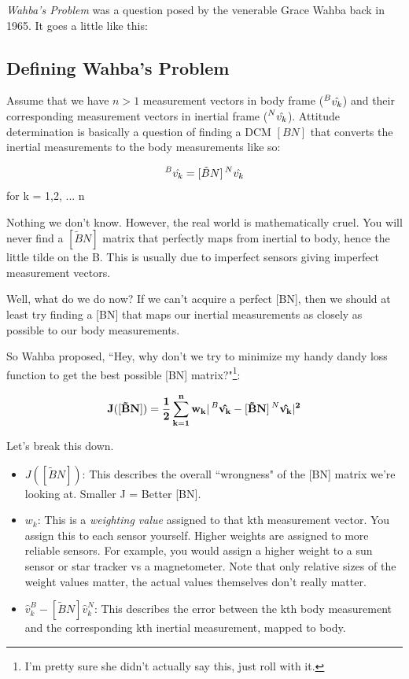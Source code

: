 \documentclass[a4paper,14pt]{extreport}
\newcommand{\vk}[1]{\prescript{#1}{}{\hat{v_k}}}
\begin{document}
\emph{Wahba's Problem} was a question posed by the venerable Grace Wahba back in 1965. It goes a little like this:
\subsection{Defining Wahba's Problem}
Assume that we have $n>1$ measurement vectors in body frame ($\vk{B}$) and their corresponding measurement vectors in inertial frame ($\vk{N}$). Attitude determination is basically a question of finding a DCM $[BN]$ that converts the inertial measurements to the body measurements like so:
\begin{center}
\[
\vk{B}= [\tilde{B}N]\vk{N}
\]
for k = 1,2, ... n
\end{center}
Nothing we don't know. However, the real world is mathematically cruel. You will never find a $[\tilde{B}N]$ matrix that perfectly maps from inertial to body, hence the little tilde on the B. This is usually due to imperfect sensors giving imperfect measurement vectors. 

Well, what do we do now? If we can't acquire a perfect [BN], then we should at least try finding a [BN] that maps our inertial measurements as closely as possible to our body measurements. 

So Wahba proposed, ``Hey, why don't we try to minimize my handy dandy loss function to get the best possible [BN] matrix?"\footnote{I'm pretty sure she didn't actually say this, just roll with it.}:

\[
\mathbf{
J([\tilde{B}N]) = \dfrac{1}{2} \sum^n_{k=1} w_k |\vk{B} - [\tilde{B}N]\vk{N}|^2}
\]

Let's break this down.
\begin{itemize}
\item{$J([\tilde{B}N])$: This describes the overall ``wrongness" of the [BN] matrix we're looking at. Smaller J = Better [BN].
}
\item{$w_k$: This is a \emph{weighting value} assigned to that kth measurement vector. You assign this to each sensor yourself. Higher weights are assigned to more reliable sensors. For example, you would assign a higher weight to a sun sensor or star tracker vs a magnetometer. Note that only relative sizes of the weight values matter, the actual values themselves don't really matter.
}
\item{$\hat{v}_k^B - [\tilde{B}N]\hat{v}_k^N$: This describes the error between the kth body measurement and the corresponding kth inertial measurement, mapped to body.}
\end{itemize}
\end{document}
